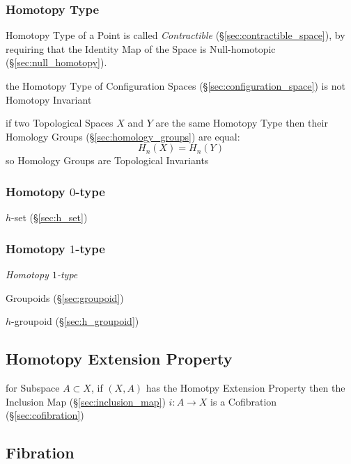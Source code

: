 \subsubsection{Homotopy Type}\label{sec:homotopy_type}

Homotopy Type of a Point is called \emph{Contractible}
(\S\ref{sec:contractible_space}), by requiring that the Identity Map
of the Space is Null-homotopic (\S\ref{sec:null_homotopy}).

the Homotopy Type of Configuration Spaces (\S\ref{sec:configuration_space}) is
not Homotopy Invariant

if two Topological Spaces $X$ and $Y$ are the same Homotopy Type then their
Homology Groups (\S\ref{sec:homology_groups}) are equal:
\[
  H_n(X) = H_n(Y)
\]
so Homology Groups are Topological Invariants



\subsubsection{Homotopy $0$-type}\label{sec:homotopy_0type}

$h$-set (\S\ref{sec:h_set})



\subsubsection{Homotopy $1$-type}\label{sec:homotopy_1type}

\emph{Homotopy $1$-type}

Groupoids (\S\ref{sec:groupoid})

$h$-groupoid (\S\ref{sec:h_groupoid})



\subsection{Homotopy Extension Property}\label{sec:homotopy_extension}

for Subspace $A \subset X$, if $(X,A)$ has the Homotpy Extension
Property then the Inclusion Map (\S\ref{sec:inclusion_map}) $i : A
\rightarrow X$ is a Cofibration (\S\ref{sec:cofibration})



\subsection{Fibration}\label{sec:fibration}

